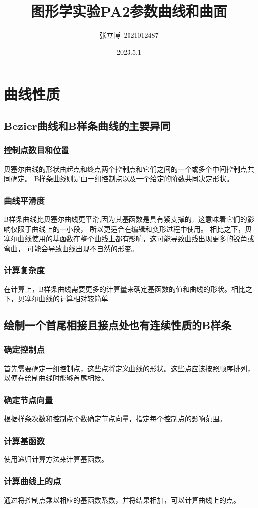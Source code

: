 \documentclass[12pt,a4paper]{article}
\title{\textbf{图形学实验PA2参数曲线和曲面}}
\author{张立博\ 2021012487}
\date{2023.5.1}
\begin{document}
\maketitle
\section{曲线性质}
\subsection{Bezier曲线和B样条曲线的主要异同}
\subsubsection{控制点数目和位置}
贝塞尔曲线的形状由起点和终点两个控制点和它们之间的一个或多个中间控制点共同确定。
B样条曲线则是由一组控制点以及一个给定的阶数共同决定形状。
\subsubsection{曲线平滑度}
B样条曲线比贝塞尔曲线更平滑,因为其基函数是具有紧支撑的，这意味着它们的影响仅限于曲线上的一小段，
所以更适合在编辑和变形过程中使用。
相比之下，贝塞尔曲线使用的基函数在整个曲线上都有影响，这可能导致曲线出现更多的锐角或弯曲，
可能会导致曲线出现不自然的形变。
\subsubsection{计算复杂度}
在计算上，B样条曲线需要更多的计算量来确定基函数的值和曲线的形状。相比之下，贝塞尔曲线的计算相对较简单
\subsection{绘制一个首尾相接且接点处也有连续性质的B样条}
\subsubsection{确定控制点}
首先需要确定一组控制点，这些点将定义曲线的形状。这些点应该按照顺序排列，以便在绘制曲线时能够首尾相接。
\subsubsection{确定节点向量}
根据样条次数和控制点个数确定节点向量，指定每个控制点的影响范围。
\subsubsection{计算基函数}
使用递归计算方法来计算基函数。
\subsubsection{计算曲线上的点}
通过将控制点乘以相应的基函数系数，并将结果相加，可以计算曲线上的点。
\end{document}

